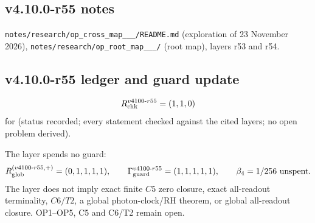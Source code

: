 \subsection*{v4.10.0-r55 notes}
\label{subsec:v4100-r55-notes}

\texttt{notes/\allowbreak research/\allowbreak op\_\allowbreak cross\_\allowbreak map\_\_\_/\allowbreak README.md} (exploration of 23 November 2026),
\texttt{notes/\allowbreak research/\allowbreak op\_\allowbreak root\_\allowbreak map\_\_\_/} (root map), layers r53 and r54.

\subsection*{v4.10.0-r55 ledger and guard update}
\label{subsec:v4100-r55-ledger-guard}

\[
R_{\rm chk}^{v4100\text{-}r55}=(1,1,0)
\]
for (status recorded; every statement checked against the cited layers; no open problem derived).

The layer spends no guard:
\[
R_{\rm glob}^{(v4100\text{-}r55,+)}=(0,1,1,1,1),
\qquad
\Gamma_{\rm guard}^{v4100\text{-}r55}=(1,1,1,1,1),
\qquad
\beta_4=1/256\ \text{unspent}.
\]
The layer does not imply exact finite \(C5\) zero closure, exact all-readout terminality, \(C6/T2\), a global photon-clock/RH theorem,
or global all-readout closure.  OP1--OP5, C5 and C6/T2 remain open.
